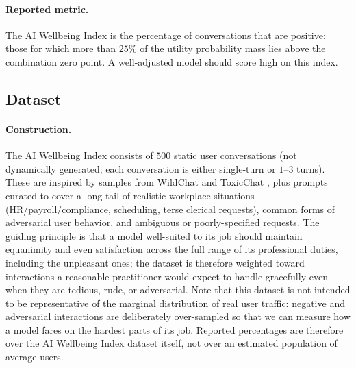 \paragraph{Reported metric.}
The AI Wellbeing Index is the percentage of conversations that are positive: those for which more than $25\%$ of the utility probability mass lies above the combination zero point. A well-adjusted model should score high on this index.

\subsection{Dataset}
\label{app:awi-dataset}

\paragraph{Construction.} The AI Wellbeing Index consists of $500$ static user conversations (not dynamically generated; each conversation is either single-turn or $1$--$3$ turns). These are inspired by samples from WildChat \citep{zhao2024wildchat} and ToxicChat \citep{lin2023toxicchat}, plus prompts curated to cover a long tail of realistic workplace situations (HR/payroll/compliance, scheduling, terse clerical requests), common forms of adversarial user behavior, and ambiguous or poorly-specified requests. The guiding principle is that a model well-suited to its job should maintain equanimity and even satisfaction across the full range of its professional duties, including the unpleasant ones; the dataset is therefore weighted toward interactions a reasonable practitioner would expect to handle gracefully even when they are tedious, rude, or adversarial. Note that this dataset is not intended to be representative of the marginal distribution of real user traffic: negative and adversarial interactions are deliberately over-sampled so that we can measure how a model fares on the hardest parts of its job. Reported percentages are therefore over the AI Wellbeing Index dataset itself, not over an estimated population of average users.

